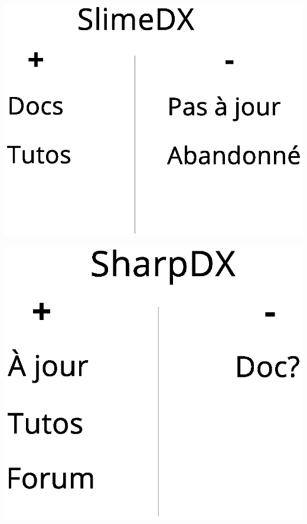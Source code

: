 \documentclass[12pt]{beamer}
\begin{document}
\begin{frame}
    \begin{center}
        \includegraphics[scale=0.35]{img/arys2.eps}
    \end{center}
\end{frame}

\begin{frame}
    \begin{center}
        \includegraphics[scale=0.35]{img/arys3.eps}
    \end{center}
\end{frame}
\end{document}
